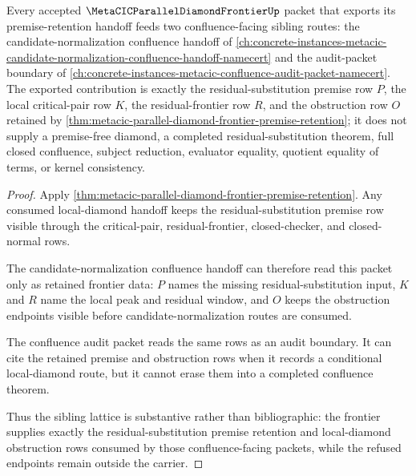 \begin{theorem}
\label{thm:metacic-parallel-diamond-frontier-sibling-route}
Every accepted $\MetaCICParallelDiamondFrontierUp$ packet that exports its premise-retention handoff feeds two confluence-facing sibling routes: the candidate-normalization confluence handoff of \autoref{ch:concrete-instances-metacic-candidate-normalization-confluence-handoff-namecert} and the audit-packet boundary of \autoref{ch:concrete-instances-metacic-confluence-audit-packet-namecert}. The exported contribution is exactly the residual-substitution premise row $P$, the local critical-pair row $K$, the residual-frontier row $R$, and the obstruction row $O$ retained by \autoref{thm:metacic-parallel-diamond-frontier-premise-retention}; it does not supply a premise-free diamond, a completed residual-substitution theorem, full closed confluence, subject reduction, evaluator equality, quotient equality of terms, or kernel consistency.
\end{theorem}
\begin{proof}
Apply \autoref{thm:metacic-parallel-diamond-frontier-premise-retention}. Any consumed local-diamond handoff keeps the residual-substitution premise row visible through the critical-pair, residual-frontier, closed-checker, and closed-normal rows.

The candidate-normalization confluence handoff can therefore read this packet only as retained frontier data: $P$ names the missing residual-substitution input, $K$ and $R$ name the local peak and residual window, and $O$ keeps the obstruction endpoints visible before candidate-normalization routes are consumed.

The confluence audit packet reads the same rows as an audit boundary. It can cite the retained premise and obstruction rows when it records a conditional local-diamond route, but it cannot erase them into a completed confluence theorem.

Thus the sibling lattice is substantive rather than bibliographic: the frontier supplies exactly the residual-substitution premise retention and local-diamond obstruction rows consumed by those confluence-facing packets, while the refused endpoints remain outside the carrier.
\end{proof}

